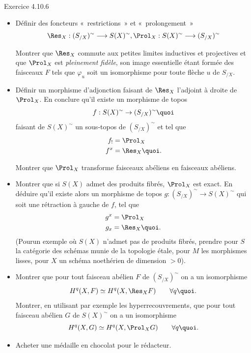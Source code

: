 \documentclass[10pt]{../fichiers-configuration-latex/smfart}
\begin{document}
\begin{enonce*}[remark]{Exercice 4.10.6}
\begin{itemize}
\item[$3^{\circ})$] Définir des foncteurs « restrictions »  et « prolongement »
$$
\Res_X:(S_{/X})^{\sim}\longrightarrow S(X)^{\sim},
\Prol_X:S(X)^{\sim}\longrightarrow (S_{/X})^{\sim}
$$

Montrer que $\Res_X$ commute aux petites limites inductives et
projectives et que $\Prol_X$ est \emph{pleinement fidèle}, son
image essentielle étant formée des faisceaux $F$ tels que
$\varphi_u$ soit un isomorphisme pour toute flèche $u$ de
$S_{/X}$.

\item[$4^{\circ})$] Définir un morphisme d'adjonction faisant de
$\Res_X$ l'adjoint à droite de $\Prol_X$. En conclure qu'il existe
un morphisme de topos
$$
f:S(X)^{\sim}\rightarrow (S_{/X})^{\sim}{\quoi}
$$
faisant de $S(X)^{\sim}$ un sous-topos de $(S_{/X})^{\sim}$ et tel
que
\begin{align*}
f_{!} &= \Prol_X\\
f^x &= \Res_X{\quoi}.
\end{align*}

Montrer que $\Prol_X$ transforme faisceaux abéliens en faisceaux
abéliens.

\item[$5^{\circ})$] Montrer que si $S(X)$ admet des produits
fibrés, $\Prol_X$ est exact. En déduire qu'il existe alors un
morphisme de topos $g:(S_{/X})^{\sim}\rightarrow S(X)^{\sim}$ qui
soit une rétraction à gauche de $f$, \ie tel que
\begin{align*}
g^x &= \Prol_X\\
g_x &= \Res_X{\quoi}.
\end{align*}
(Pour\pageoriginale un exemple où $S(X)$ n'admet pas de produits
fibrés, prendre pour $S$ la catégorie des schémas munie de la
topologie étale, pour $M$ les morphismes lisses, pour $X$ un
schéma noethérien de dimension $>0$).

\item[$6^{\circ})$] Montrer que pour tout faisceau abélien $F$ de
$(S_{/X})^{\sim}$ on a un isomorphisme
$$
H^q(X,F)\simeq H^q(X,\Res_X F)\qquad \forall q{\quoi}.
$$
Montrer, en utilisant par exemple les hyperrecouvrements, que pour
tout faisceau abélien $G$ de $S(X)^{\sim}$ on a un isomorphisme
$$
H^q(X,G)\simeq H^q(X,\Prol_X G)\qquad \forall q{\quoi}.
$$

\item[$7^{\circ})$] Acheter une médaille en chocolat pour le rédacteur.
\end{itemize}
\end{enonce*}
\end{document}
